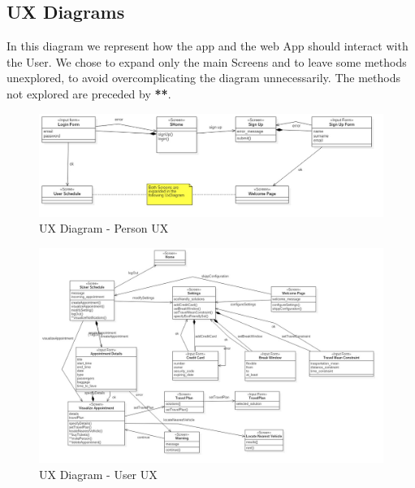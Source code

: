 \subsection{UX Diagrams}
In this diagram we represent how the app and the web App should interact with the User. We chose to expand only the main Screens and to leave some methods unexplored, to avoid overcomplicating the diagram unnecessarily. The methods not explored are preceded by \textbf{**}.

	\begin{figure}[H]	
		\centerline{\includegraphics[width=0.9\paperwidth]{Images/UxPerson}}
		\caption{UX Diagram - Person UX}
	\end{figure}	
	\begin{figure}[H]	
		\centerline{\includegraphics[width=0.9\paperwidth]{Images/UxUser}}
		\caption{UX Diagram - User UX}
	\end{figure}